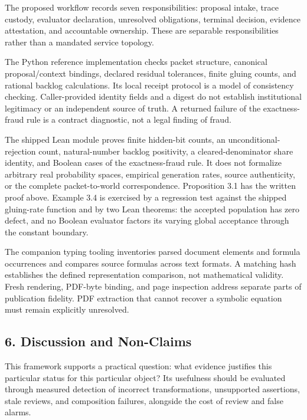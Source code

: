 \documentclass[
  10pt,
]{article}
\begin{document}
The proposed workflow records seven responsibilities: proposal intake, trace custody, evaluator declaration, unresolved obligations, terminal decision, evidence attestation, and accountable ownership. These are separable responsibilities rather than a mandated service topology.

The Python reference implementation checks packet structure, canonical proposal/context bindings, declared residual tolerances, finite gluing counts, and rational backlog calculations. Its local receipt protocol is a model of consistency checking. Caller-provided identity fields and a digest do not establish institutional legitimacy or an independent source of truth. A returned failure of the exactness-fraud rule is a contract diagnostic, not a legal finding of fraud.

The shipped Lean module proves finite hidden-bit counts, an unconditional-rejection count, natural-number backlog positivity, a cleared-denominator share identity, and Boolean cases of the exactness-fraud rule. It does not formalize arbitrary real probability spaces, empirical generation rates, source authenticity, or the complete packet-to-world correspondence. Proposition 3.1 has the written proof above. Example 3.4 is exercised by a regression test against the shipped gluing-rate function and by two Lean theorems: the accepted population has zero defect, and no Boolean evaluator factors its varying global acceptance through the constant boundary.

The companion typing tooling inventories parsed document elements and formula occurrences and compares source formulas across text formats. A matching hash establishes the defined representation comparison, not mathematical validity. Fresh rendering, PDF-byte binding, and page inspection address separate parts of publication fidelity. PDF extraction that cannot recover a symbolic equation must remain explicitly unresolved.

\subsection{6. Discussion and Non-Claims}\label{discussion-and-non-claims}

This framework supports a practical question: what evidence justifies this particular status for this particular object? Its usefulness should be evaluated through measured detection of incorrect transformations, unsupported assertions, stale reviews, and composition failures, alongside the cost of review and false alarms.
\end{document}
